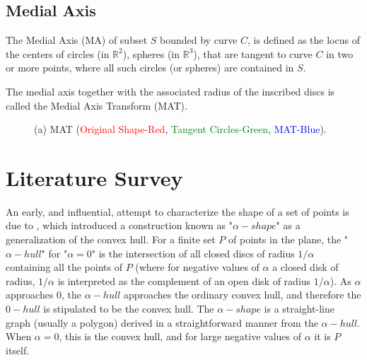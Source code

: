\documentclass[preprint,5p,times,twocolumn]{elsarticle}
\begin{document}
\subsection{Medial Axis}
The Medial Axis (MA) of subset $S$ bounded by curve $C$, is defined as the locus of the centers of circles (in $\mathbb{R}^2$), spheres (in $\mathbb{R}^3$), that are tangent to curve $C$ in two or more points, where all such circles (or spheres) are contained in $S$.

The medial axis together with the associated radius of the inscribed discs is called the Medial Axis Transform (MAT).


\begin{figure}[!h]
	\centering
	\caption{
		(a) MAT (\textcolor{red}{Original Shape-Red}, \textcolor{green}{Tangent Circles-Green}, \textcolor{blue}{MAT-Blue}). 
	}
\end{figure}


\section{Literature Survey}

An early, and influential, attempt to characterize the shape of a set of points is due to \cite{Edelsbrunner:2006:SSP:2263365.2270180}, which introduced a construction known as "$\alpha-shape$" as a generalization of the convex hull. For a finite set $P$ of points in the plane, the "$\alpha-hull$" for "$\alpha = 0$" is the intersection of all closed discs of radius $1/\alpha$ containing all the points of $P$ (where for negative values of $\alpha$ a closed disk of radius, $1/\alpha$ is interpreted as the complement of an open disk of radius $1/\alpha$). As $\alpha$ approaches 0, the $\alpha-hull$ approaches the ordinary convex hull, and therefore the $0-hull$ is stipulated to be the convex hull. The $\alpha-shape$ is a straight-line graph (usually a polygon) derived in a straightforward manner from the $\alpha-hull$. When $\alpha = 0$, this is the convex hull, and for large negative values of $\alpha$ it is $P$ itself.
\end{document}
